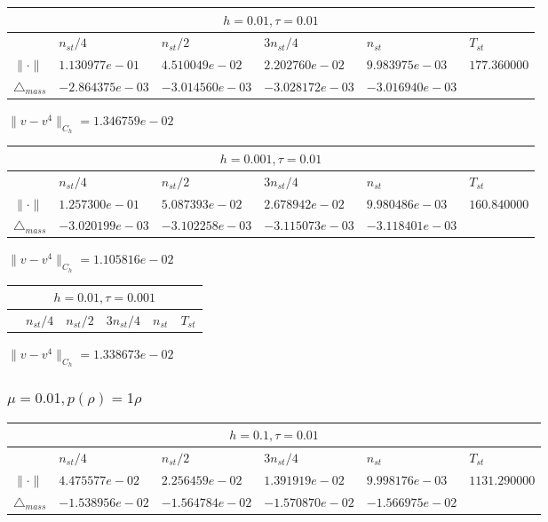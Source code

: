\begin{tabular}{*{6}{|l}|}
    \hline
     \\
    \hline
    &$n_{st}/4 $&$ n_{st}/2$&$3n_{st}/4$&$n_{st}$&$T_{st}$ \\
    \hline
$\|\cdot \|$& $1.130977e-01$ & $4.510049e-02$ & $2.202760e-02$ & $9.983975e-03$ &$177.360000$\\
\hline
$\triangle_{mass}$& $-2.864375e-03$ & $-3.014560e-03$ & $-3.028172e-03$ & $-3.016940e-03$ &\\
\hline
\end{tabular}

$\|v-v^{4}\|_{C_h} = 1.346759e-02$


\begin{tabular}{*{6}{|l}|}
    \hline
     \\
    \hline
    &$n_{st}/4 $&$ n_{st}/2$&$3n_{st}/4$&$n_{st}$&$T_{st}$ \\
    \hline
    $\|\cdot \|$& $1.257300e-01$ & $5.087393e-02$ & $2.678942e-02$ & $9.980486e-03$ &$160.840000$\\
\hline
$\triangle_{mass}$& $-3.020199e-03$ & $-3.102258e-03$ & $-3.115073e-03$ & $-3.118401e-03$ &\\
\hline
\end{tabular}

$\|v-v^{4}\|_{C_h} = 1.105816e-02$

\begin{tabular}{*{6}{|l}|}
    \hline
     \\
    \hline
    &$n_{st}/4 $&$ n_{st}/2$&$3n_{st}/4$&$n_{st}$&$T_{st}$ \\
    \hline
\end{tabular}

$\|v-v^{4}\|_{C_h} = 1.338673e-02$

\subsubsection{$\mu = 0.01, p(\rho) = 1\rho $}

\begin{tabular}{*{6}{|l}|}
    \hline
     \\
    \hline
    &$n_{st}/4 $&$ n_{st}/2$&$3n_{st}/4$&$n_{st}$&$T_{st}$ \\
    \hline
$\|\cdot \|$& $4.475577e-02$ & $2.256459e-02$ & $1.391919e-02$ & $9.998176e-03$ &$1131.290000$\\
\hline
$\triangle_{mass}$& $-1.538956e-02$ & $-1.564784e-02$ & $-1.570870e-02$ & $-1.566975e-02$ &\\
\hline    
\end{tabular}

